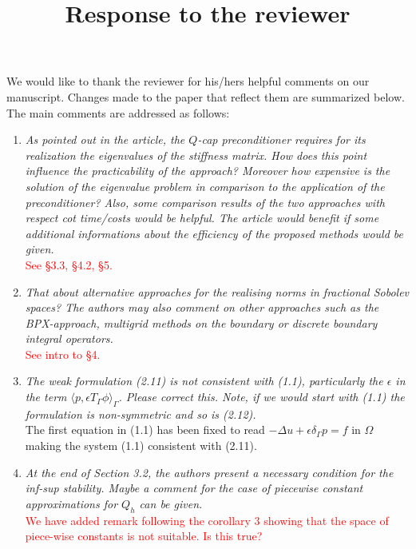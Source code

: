 \documentclass[10pt, a4paper]{article}
\title{\large{Response to the reviewer}}
\date{}
\renewcommand{\brack}[1]{\langle#1\rangle}
\begin{document}
\maketitle

We would like to thank the reviewer for his/hers helpful comments on our manuscript. 
Changes made to the paper that reflect them are summarized below. The main
comments are addressed as follows:

\begin{enumerate}
  \item{\textit{As pointed out in the article, the $Q$-cap preconditioner
    requires for its realization the eigenvalues of the stiffness matrix. How
    does this point influence the practicability of the approach? Moreover how
    expensive is the solution of the eigenvalue problem in comparison to the
    application of the preconditioner? Also, some comparison results of the two
    approaches with respect cot time/costs would be helpful. The article would
    benefit if some additional informations about the efficiency of the proposed
    methods would be given.
    }\\
    \textcolor{red}{See \S 3.3, \S 4.2, \S 5.}
}
  \item{\textit{That about alternative approaches for the realising norms in
    fractional Sobolev spaces? The authors may also comment on other approaches
    such as the BPX-approach, multigrid methods on the boundary or discrete
    boundary integral operators.}\\
    \textcolor{red}{See intro to \S 4.}
    }
  \item{\textit{The weak formulation (2.11) is not consistent with (1.1),
    particularly the $\epsilon$ in the term $\brack{p, \epsilon T_\Gamma
    \phi}_{\Gamma}$. Please correct this. Note, if we would start with (1.1) the
    formulation is non-symmetric and so is (2.12).}\\
    The first equation in (1.1) has been fixed to read 
    $-\Delta u + \epsilon\delta_{\Gamma} p= f \mbox{ in } \Omega$ making the
    system (1.1) consistent with (2.11). 
}
  \item{\textit{At the end of Section 3.2, the authors present a necessary
    condition for the inf-sup stability. Maybe a comment for the case of
    piecewise constant approximations for $Q_h$ can be given.}\\
    \textcolor{red}{We have added remark following the corollary 3 showing 
    that the space of piece-wise constants is not suitable. Is this true?}
}
\end{enumerate}
\end{document}
